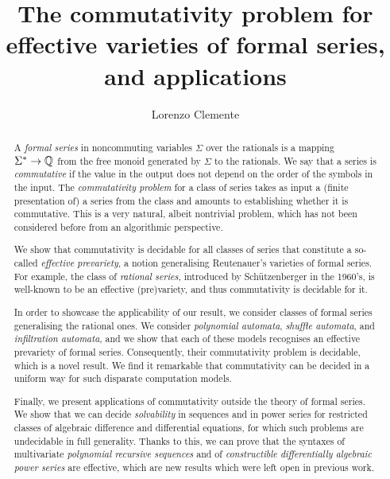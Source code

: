 \documentclass[manuscript,screen,review,natbib=false]{acmart}
\begin{document}
\title
  [The commutativity problem for effective varieties of formal series]
  {The commutativity problem for effective varieties of formal series,\\ and applications}

\author{Lorenzo Clemente}


\begin{abstract}
  A \emph{formal series} in noncommuting variables $\Sigma$ over the rationals is a mapping $\Sigma^* \to \mathbb Q$
  from the free monoid generated by $\Sigma$ to the rationals.
  We say that a series is \emph{commutative} if the value in the output
  does not depend on the order of the symbols in the input.
  The \emph{commutativity problem} for a class of series
  takes as input a (finite presentation of) a series from the class
  and amounts to establishing whether it is commutative.
  This is a very natural, albeit nontrivial problem,
  which has not been considered before from an algorithmic perspective.

  We show that commutativity is decidable
  for all classes of series that constitute a so-called \emph{effective prevariety},
  a notion generalising Reutenauer's varieties of formal series.
  For example, the class of \emph{rational series},
  introduced by Schützenberger in the 1960's,
  is well-known to be an effective (pre)variety,
  and thus commutativity is decidable for it.

  In order to showcase the applicability of our result,
  we consider classes of formal series generalising the rational ones.
  We consider \emph{polynomial automata},
  \emph{shuffle automata},
  and \emph{infiltration automata},
  and we show that each of these models
  recognises an effective prevariety of formal series.
  Consequently, their commutativity problem is decidable,
  which is a novel result.
  We find it remarkable that commutativity can be decided in a uniform way
  for such disparate computation models.

  Finally, we present applications of commutativity outside the theory of formal series.
  We show that we can decide \emph{solvability} in sequences and in power series
  for restricted classes of algebraic difference and differential equations,
  for which such problems are undecidable in full generality.
  Thanks to this, we can prove that the syntaxes of multivariate \emph{polynomial recursive sequences}
  and of \emph{constructible differentially algebraic power series} are effective,
  which are new results which were left open in previous work.
\end{abstract}
\end{document}
